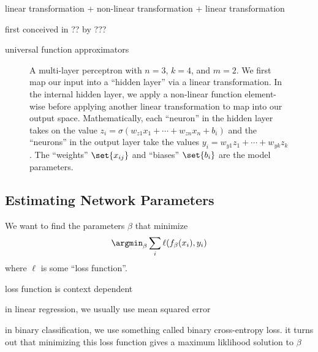 linear transformation + non-linear transformation + linear transformation

first conceived in ?? by ???

universal function approximators

\begin{figure}
	\centering

	\caption{A multi-layer perceptron with $n = 3$, $k = 4$, and $m = 2$.  We first map our input into a ``hidden layer'' via a linear transformation. In the internal hidden layer, we apply a non-linear function element-wise before applying another linear transformation to map into our output space. Mathematically, each ``neuron'' in the hidden layer takes on the value $z_i = \sigma(w_{z1} x_1 + \cdots + w_{zn} x_n + b_{i})$ and the ``neurons'' in the output layer take the values $y_i = w_{y1} z_1 + \cdots + w_{yk} z_k$. The ``weights'' $\set{x_{ij}}$ and ``biases'' $\set{b_{i}}$ are the model parameters.}
\end{figure}

\subsection{Estimating Network Parameters}

We want to find the parameters $\beta$ that minimize
\begin{equation*}
	\argmin_\beta \sum_i \ell(f_\beta(x_i), y_i)
\end{equation*}
where $\ell$ is some ``loss function''.

loss function is context dependent

in linear regression, we usually use mean squared error

in binary classification, we use something called binary cross-entropy loss. it turns out that minimizing this loss function gives a maximum liklihood solution to $\beta$

